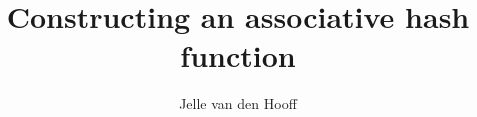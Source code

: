 \documentclass[10pt,letterpaper]{artikel3}
\begin{document}
\title{Constructing an associative hash function}
\author{Jelle van den Hooff}
\date{\vspace{-2ex}}
\maketitle










\end{document}
